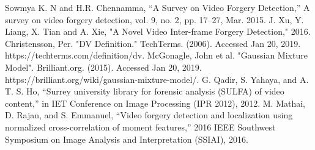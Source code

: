 \documentclass[conference]{IEEEtran}
\begin{document}
\begin{thebibliography}{00}
 Sowmya K. N and H.R. Chennamma, “A Survey on Video Forgery Detection,” A survey on video forgery detection, vol. 9, no. 2, pp. 17–27, Mar. 2015.
 J. Xu, Y. Liang, X. Tian and A. Xie, "A Novel Video Inter-frame Forgery Detection," 2016. 
 Christensson, Per. "DV Definition." TechTerms. (2006). Accessed Jan 20, 2019. https://techterms.com/definition/dv.
 McGonagle, John et al. "Gaussian Mixture Model". Brilliant.org. (2015). Accessed Jan 20, 2019. https://brilliant.org/wiki/gaussian-mixture-model/.
 G. Qadir, S. Yahaya, and A. T. S. Ho, ``Surrey university library for forensic analysis (SULFA) of video content,'' in IET Conference on Image Processing (IPR 2012), 2012.
 M. Mathai, D. Rajan, and S. Emmanuel, ``Video forgery detection and localization using normalized cross-correlation of moment features,'' 2016 IEEE Southwest Symposium on Image Analysis and Interpretation (SSIAI), 2016.
\vspace{12pt}
\end{thebibliography}
\end{document}
